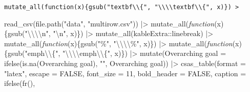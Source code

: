 \documentclass[12pt]{article}\usepackage[]{graphicx}\usepackage[]{color}
\newenvironment{Shaded}{\begin{snugshade}}{\end{snugshade}}
\newcommand{\AttributeTok}[1]{\textcolor[rgb]{0.77,0.63,0.00}{#1}}
\newcommand{\ConstantTok}[1]{\textcolor[rgb]{0.00,0.00,0.00}{#1}}
\newcommand{\ControlFlowTok}[1]{\textcolor[rgb]{0.13,0.29,0.53}{\textit{#1}}}
\newcommand{\DecValTok}[1]{\textcolor[rgb]{0.00,0.00,0.81}{#1}}
\newcommand{\FunctionTok}[1]{\textcolor[rgb]{0.00,0.00,0.00}{#1}}
\newcommand{\NormalTok}[1]{#1}
\newcommand{\OtherTok}[1]{\textcolor[rgb]{0.56,0.35,0.01}{#1}}
\newcommand{\SpecialCharTok}[1]{\textcolor[rgb]{0.00,0.00,0.00}{#1}}
\newcommand{\StringTok}[1]{\textcolor[rgb]{0.31,0.60,0.02}{#1}}
\begin{document}
\texttt{mutate\_all(function(x)\{gsub("textbf\textbackslash{}\textbackslash{}\{",\ "\textbackslash{}\textbackslash{}\textbackslash{}\textbackslash{}textbf\textbackslash{}\textbackslash{}\{",\ x)\})\ \textbar{}\textgreater{}}
\begin{Shaded}
\begin{Highlighting}[]
\FunctionTok{read\_csv}\NormalTok{(}\FunctionTok{file.path}\NormalTok{(}\StringTok{"data"}\NormalTok{, }\StringTok{"multirow.csv"}\NormalTok{)) }\SpecialCharTok{|\textgreater{}} 
  \FunctionTok{mutate\_all}\NormalTok{(}\ControlFlowTok{function}\NormalTok{(x)\{}\FunctionTok{gsub}\NormalTok{(}\StringTok{"}\SpecialCharTok{\textbackslash{}\textbackslash{}\textbackslash{}\textbackslash{}}\StringTok{n"}\NormalTok{, }\StringTok{"}\SpecialCharTok{\textbackslash{}n}\StringTok{"}\NormalTok{, x)\}) }\SpecialCharTok{|\textgreater{}} 
  \FunctionTok{mutate\_all}\NormalTok{(kableExtra}\SpecialCharTok{::}\NormalTok{linebreak) }\SpecialCharTok{|\textgreater{}}
  \FunctionTok{mutate\_all}\NormalTok{(}\ControlFlowTok{function}\NormalTok{(x)\{}\FunctionTok{gsub}\NormalTok{(}\StringTok{"\%"}\NormalTok{, }\StringTok{"}\SpecialCharTok{\textbackslash{}\textbackslash{}\textbackslash{}\textbackslash{}}\StringTok{\%"}\NormalTok{, x)\}) }\SpecialCharTok{|\textgreater{}} 
  \FunctionTok{mutate\_all}\NormalTok{(}\ControlFlowTok{function}\NormalTok{(x)\{}\FunctionTok{gsub}\NormalTok{(}\StringTok{"emph}\SpecialCharTok{\textbackslash{}\textbackslash{}}\StringTok{\{"}\NormalTok{, }\StringTok{"}\SpecialCharTok{\textbackslash{}\textbackslash{}\textbackslash{}\textbackslash{}}\StringTok{emph}\SpecialCharTok{\textbackslash{}\textbackslash{}}\StringTok{\{"}\NormalTok{, x)\}) }\SpecialCharTok{|\textgreater{}} 
  \FunctionTok{mutate}\NormalTok{(}\StringTok{\textasciigrave{}}\AttributeTok{Overarching goal}\StringTok{\textasciigrave{}} \OtherTok{=} \FunctionTok{ifelse}\NormalTok{(}\FunctionTok{is.na}\NormalTok{(}\StringTok{\textasciigrave{}}\AttributeTok{Overarching goal}\StringTok{\textasciigrave{}}\NormalTok{),}
                                     \StringTok{""}\NormalTok{,}
                                     \StringTok{\textasciigrave{}}\AttributeTok{Overarching goal}\StringTok{\textasciigrave{}}\NormalTok{)) }\SpecialCharTok{|\textgreater{}} 
  \FunctionTok{csas\_table}\NormalTok{(}\AttributeTok{format =} \StringTok{"latex"}\NormalTok{,}
             \AttributeTok{escape =} \ConstantTok{FALSE}\NormalTok{,}
             \AttributeTok{font\_size =} \DecValTok{11}\NormalTok{,}
             \AttributeTok{bold\_header =} \ConstantTok{FALSE}\NormalTok{,}
             \AttributeTok{caption =} \FunctionTok{ifelse}\NormalTok{(}\FunctionTok{fr}\NormalTok{(),}

\end{Highlighting}
\end{Shaded}
\end{document}
